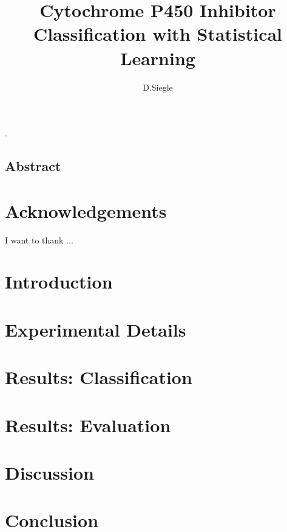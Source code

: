 .\documentclass[12pt]{report}
\author{D.Siegle}
\title{Cytochrome P450 Inhibitor Classification with Statistical Learning}
\date{}
\begin{document}
\maketitle

\begin{doublespacing}
\chapter*{Abstract}

\end{doublespacing}

\tableofcontents
\listoffigures
\listoftables

\begin{doublespacing}
\chapter*{Acknowledgements}
I want to thank ...

\chapter{Introduction}


\chapter{Experimental Details}


\chapter{Results: Classification}


\chapter{Results: Evaluation}




\chapter{Discussion}


\chapter{Conclusion}


\end{doublespacing}

{}

\end{document}
